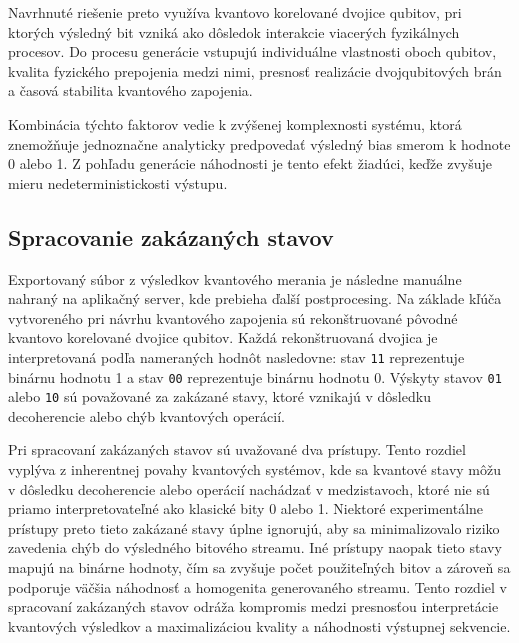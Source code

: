 Navrhnuté riešenie preto využíva kvantovo korelované dvojice qubitov, pri ktorých výsledný bit vzniká ako dôsledok interakcie viacerých fyzikálnych procesov.
Do procesu generácie vstupujú individuálne vlastnosti oboch qubitov, kvalita fyzického prepojenia medzi nimi, presnosť realizácie dvojqubitových brán a časová stabilita kvantového zapojenia.

Kombinácia týchto faktorov vedie k zvýšenej komplexnosti systému, ktorá znemožňuje jednoznačne analyticky predpovedať výsledný bias smerom k hodnote 0 alebo 1.
Z pohľadu generácie náhodnosti je tento efekt žiadúci, keďže zvyšuje mieru nedeterministickosti výstupu.






\subsection{Spracovanie zakázaných stavov}

Exportovaný súbor z výsledkov kvantového merania je následne manuálne nahraný na aplikačný server, kde prebieha ďalší postprocesing.
Na základe kľúča vytvoreného pri návrhu kvantového zapojenia sú rekonštruované pôvodné kvantovo korelované dvojice qubitov.
Každá rekonštruovaná dvojica je interpretovaná podľa nameraných hodnôt nasledovne:
stav \texttt{11} reprezentuje binárnu hodnotu 1 a stav \texttt{00} reprezentuje binárnu hodnotu 0.
Výskyty stavov \texttt{01} alebo \texttt{10} sú považované za zakázané stavy, ktoré vznikajú v dôsledku decoherencie alebo chýb kvantových operácií.

Pri spracovaní zakázaných stavov sú uvažované dva prístupy.
Tento rozdiel vyplýva z inherentnej povahy kvantových systémov, kde sa kvantové stavy môžu v dôsledku decoherencie alebo operácií nachádzať v medzistavoch, ktoré nie sú priamo interpretovateľné ako klasické bity 0 alebo 1.
Niektoré experimentálne prístupy preto tieto zakázané stavy úplne ignorujú, aby sa minimalizovalo riziko zavedenia chýb do výsledného bitového streamu.
Iné prístupy naopak tieto stavy mapujú na binárne hodnoty, čím sa zvyšuje počet použiteľných bitov a zároveň sa podporuje väčšia náhodnosť a homogenita generovaného streamu.
Tento rozdiel v spracovaní zakázaných stavov odráža kompromis medzi presnosťou interpretácie kvantových výsledkov a maximalizáciou kvality a náhodnosti výstupnej sekvencie.

